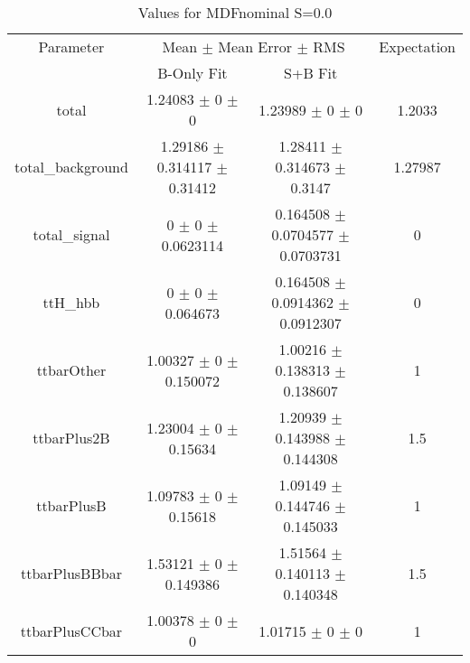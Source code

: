 \begin{table}
\centering
\caption{Values for MDFnominal S=0.0}
\begin{tabular}{cccc}
\toprule
Parameter & \multicolumn{2}{c}{Mean $\pm$ Mean Error $\pm$ RMS} & Expectation\\
 & B-Only Fit & S+B Fit & \\
\midrule
total & \num{1.24083} $\pm$ \num{0} $\pm$ \num{0} & \num{1.23989} $\pm$ \num{0} $\pm$ \num{0} & \num{1.2033}\\
total\_background & \num{1.29186} $\pm$ \num{0.314117} $\pm$ \num{0.31412} & \num{1.28411} $\pm$ \num{0.314673} $\pm$ \num{0.3147} & \num{1.27987}\\
total\_signal & \num{0} $\pm$ \num{0} $\pm$ \num{0.0623114} & \num{0.164508} $\pm$ \num{0.0704577} $\pm$ \num{0.0703731} & \num{0}\\
ttH\_hbb & \num{0} $\pm$ \num{0} $\pm$ \num{0.064673} & \num{0.164508} $\pm$ \num{0.0914362} $\pm$ \num{0.0912307} & \num{0}\\
ttbarOther & \num{1.00327} $\pm$ \num{0} $\pm$ \num{0.150072} & \num{1.00216} $\pm$ \num{0.138313} $\pm$ \num{0.138607} & \num{1}\\
ttbarPlus2B & \num{1.23004} $\pm$ \num{0} $\pm$ \num{0.15634} & \num{1.20939} $\pm$ \num{0.143988} $\pm$ \num{0.144308} & \num{1.5}\\
ttbarPlusB & \num{1.09783} $\pm$ \num{0} $\pm$ \num{0.15618} & \num{1.09149} $\pm$ \num{0.144746} $\pm$ \num{0.145033} & \num{1}\\
ttbarPlusBBbar & \num{1.53121} $\pm$ \num{0} $\pm$ \num{0.149386} & \num{1.51564} $\pm$ \num{0.140113} $\pm$ \num{0.140348} & \num{1.5}\\
ttbarPlusCCbar & \num{1.00378} $\pm$ \num{0} $\pm$ \num{0} & \num{1.01715} $\pm$ \num{0} $\pm$ \num{0} & \num{1}\\
\bottomrule
\end{tabular}
\end{table}
